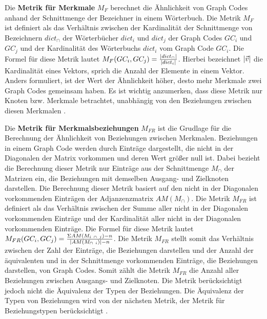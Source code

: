 
Die \textbf{Metrik für Merkmale} $M_F$ berechnet die Ähnlichkeit von Graph Codes anhand der Schnittmenge der Bezeichner in einem Wörterbuch.
Die Metrik $M_F$ ist definiert als das Verhältnis zwischen der Kardinalität der Schnittmenge von Bezeichnern $dict_{\cap}$ der Wörterbücher $dict_i$ und $dict_j$ der Graph Codes $GC_i$ und $GC_j$ und der Kardinalität des Wörterbuchs $dict_i$ vom Graph Code $GC_i$.
Die Formel für diese Metrik lautet $M_F(GC_i, GC_j) = \frac{\abs{dict_{\cap}}}{\abs{dict_i}}$.
Hierbei bezeichnet $\abs{\Vec{v}}$ die Kardinalität eines Vektors, sprich die Anzahl der Elemente in einem Vektor.
Anders formuliert, ist der Wert der Ähnlichkeit höher, desto mehr Merkmale zwei Graph Codes gemeinsam haben.
Es ist wichtig anzumerken, dass diese Metrik nur Knoten bzw. Merkmale betrachtet, unabhängig von den Beziehungen zwischen diesen Merkmalen \cite{gc-2d-proj-mmfg}.

Die \textbf{Metrik für Merkmalsbeziehungen} $M_{FR}$ ist die Grudlage für die Berechnung der Ähnlichkeit von Beziehungen zwischen Merkmalen.
Beziehungen in einem Graph Code werden durch Einträge dargestellt, die nicht in der Diagonalen der Matrix vorkommen und deren Wert größer null ist.
Dabei bezieht die Berechnung dieser Metrik nur Einträge aus der Schnittmenge $M_{\cap}$ der Matrizen ein, die Beziehungen mit demselben Ausgang- und Zielknoten darstellen.
Die Berechnung dieser Metrik basiert auf den nicht in der Diagonalen vorkommenden Einträgen der Adjanzenzmatrix $AM(M_{\cap})$.
Die Metrik $M_{FR}$ ist definiert als das Verhältnis zwischen der Summe aller nicht in der Diagonalen vorkommenden Einträge und der Kardinalität aller nicht in der Diagonalen vorkommenden Einträge.
Die Formel für diese Metrik lautet $M_{FR}(GC_i, GC_j) = \frac{\Sigma AM(M_{i~\cap~j}) -n}{\abs{AM(M_{\cap~i})} - n}$.
Die Metrik $M_{FR}$ stellt somit das Verhältnis zwischen der Zahl der Einträge, die Beziehungen darstellen und der Anzahl der äquivalenten und in der Schnittmenge vorkommenden Einträge, die Beziehungen darstellen, von Graph Codes.
Somit zählt die Metrik $M_{FR}$ die Anzahl aller Beziehungen zwischen Ausgangs- und Zielknoten.
Die Metrik berücksichtigt jedoch nicht die Äquivalenz der Typen der Beziehungen.
Die Äquivalenz der Typen von Beziehungen wird von der nächsten Metrik, der Metrik für Beziehungstypen berücksichtigt \cite{gc-2d-proj-mmfg}.

